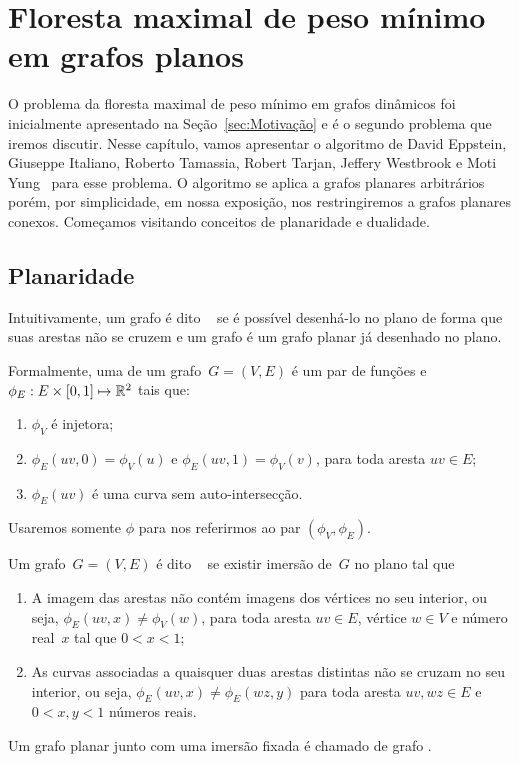 \chapter{Floresta maximal de peso mínimo em grafos planos}
\label{sec:MSF}

O problema da floresta maximal de peso mínimo em grafos dinâmicos foi inicialmente apresentado na Seção~\ref{sec:Motivação} e é o segundo problema que iremos discutir.
Nesse capítulo, vamos apresentar o algoritmo de David Eppstein, Giuseppe Italiano, Roberto Tamassia, Robert Tarjan, Jeffery Westbrook e Moti Yung~\cite{EPPSTEIN-planar} para esse problema.
O algoritmo se aplica a grafos planares arbitrários porém, por simplicidade, em nossa exposição, nos restringiremos a grafos planares conexos.
Começamos visitando conceitos de planaridade e dualidade.


\section{Planaridade}

Intuitivamente, um grafo é dito ~\cite{planarTheoryAlgorith} se é possível desenhá-lo no plano de forma que suas arestas não se cruzem e um grafo  é um grafo planar já desenhado no plano.

Formalmente, uma  de um grafo~$G=(V,E)$ é um par de funções  e $\phi_E: E\times [0,1]\mapsto \mathbb{R}^2$ tais que:
\begin{enumerate}
\item $\phi_V$ é injetora; 
\item $\phi_E(uv,0) = \phi_V(u)$ e $\phi_E(uv,1) = \phi_V(v)$, para toda aresta $uv\in E$;
\item $\phi_E(uv)$ é uma curva sem auto-intersecção.
\end{enumerate}
Usaremos somente $\phi$ para nos referirmos ao par $(\phi_V,\phi_E)$.

Um grafo~$G=(V,E)$ é dito ~\cite{noma2003} se existir imersão de~$G$ no plano tal que
\begin{enumerate}
\item A imagem das arestas não contém imagens dos vértices no seu interior, ou seja, $\phi_E(uv,x) \neq \phi_V(w)$, para toda aresta $uv\in E$, vértice $w\in V$ e número real~$x$ tal que $0<x<1$;
\item As curvas associadas a quaisquer duas arestas distintas não se cruzam no seu interior, ou seja, $\phi_E(uv,x)\neq \phi_E(wz,y)$ para toda aresta $uv,wz\in E$ e $0<x,y<1$ números reais.
\end{enumerate}
Um grafo planar junto com uma imersão fixada é chamado de grafo .

